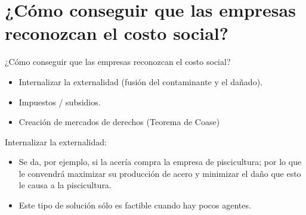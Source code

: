 \section[Reconcimiento]{¿Cómo conseguir que las empresas reconozcan el costo social?}

\begin{frame}{¿Cómo conseguir que las empresas reconozcan el costo social?}
	\begin{itemize}
		\item Internalizar la externalidad (fusión del contaminante y el dañado).
		\item Impuestos / subsidios.
		\item Creación de mercados de derechos (Teorema de Coase)
	\end{itemize}
\end{frame}
\begin{frame}{Internalizar la externalidad:}
	\begin{itemize}
		\item Se da, por ejemplo, si la acería compra la empresa de piscicultura; por lo que le convendrá maximizar su producción de acero y minimizar el daño que esto le causa a la piscicultura.
		\item Este tipo de solución sólo es factible cuando hay pocos agentes.
	\end{itemize}
\end{frame}
